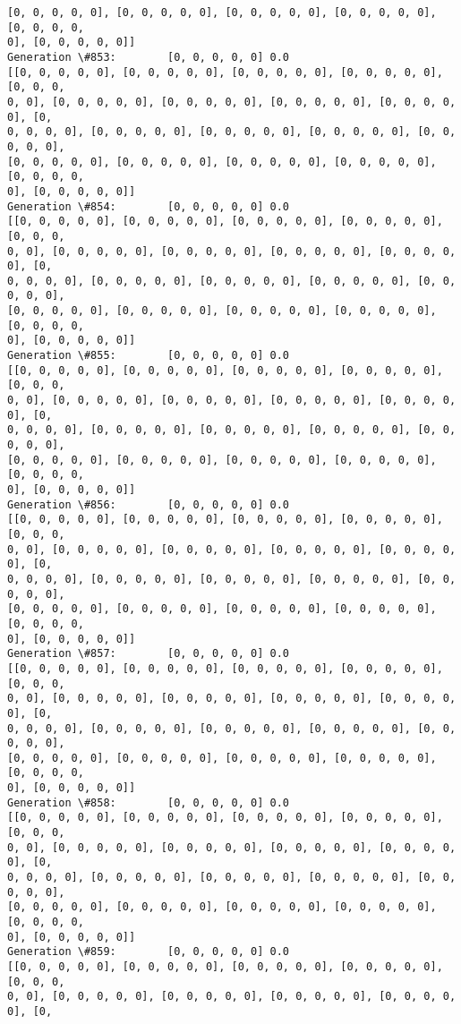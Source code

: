 \documentclass[11pt]{article}
\begin{document}
\begin{Verbatim}[commandchars=\\\{\}]
[0, 0, 0, 0, 0], [0, 0, 0, 0, 0], [0, 0, 0, 0, 0], [0, 0, 0, 0, 0], [0, 0, 0, 0,
0], [0, 0, 0, 0, 0]]
Generation \#853:        [0, 0, 0, 0, 0] 0.0
[[0, 0, 0, 0, 0], [0, 0, 0, 0, 0], [0, 0, 0, 0, 0], [0, 0, 0, 0, 0], [0, 0, 0,
0, 0], [0, 0, 0, 0, 0], [0, 0, 0, 0, 0], [0, 0, 0, 0, 0], [0, 0, 0, 0, 0], [0,
0, 0, 0, 0], [0, 0, 0, 0, 0], [0, 0, 0, 0, 0], [0, 0, 0, 0, 0], [0, 0, 0, 0, 0],
[0, 0, 0, 0, 0], [0, 0, 0, 0, 0], [0, 0, 0, 0, 0], [0, 0, 0, 0, 0], [0, 0, 0, 0,
0], [0, 0, 0, 0, 0]]
Generation \#854:        [0, 0, 0, 0, 0] 0.0
[[0, 0, 0, 0, 0], [0, 0, 0, 0, 0], [0, 0, 0, 0, 0], [0, 0, 0, 0, 0], [0, 0, 0,
0, 0], [0, 0, 0, 0, 0], [0, 0, 0, 0, 0], [0, 0, 0, 0, 0], [0, 0, 0, 0, 0], [0,
0, 0, 0, 0], [0, 0, 0, 0, 0], [0, 0, 0, 0, 0], [0, 0, 0, 0, 0], [0, 0, 0, 0, 0],
[0, 0, 0, 0, 0], [0, 0, 0, 0, 0], [0, 0, 0, 0, 0], [0, 0, 0, 0, 0], [0, 0, 0, 0,
0], [0, 0, 0, 0, 0]]
Generation \#855:        [0, 0, 0, 0, 0] 0.0
[[0, 0, 0, 0, 0], [0, 0, 0, 0, 0], [0, 0, 0, 0, 0], [0, 0, 0, 0, 0], [0, 0, 0,
0, 0], [0, 0, 0, 0, 0], [0, 0, 0, 0, 0], [0, 0, 0, 0, 0], [0, 0, 0, 0, 0], [0,
0, 0, 0, 0], [0, 0, 0, 0, 0], [0, 0, 0, 0, 0], [0, 0, 0, 0, 0], [0, 0, 0, 0, 0],
[0, 0, 0, 0, 0], [0, 0, 0, 0, 0], [0, 0, 0, 0, 0], [0, 0, 0, 0, 0], [0, 0, 0, 0,
0], [0, 0, 0, 0, 0]]
Generation \#856:        [0, 0, 0, 0, 0] 0.0
[[0, 0, 0, 0, 0], [0, 0, 0, 0, 0], [0, 0, 0, 0, 0], [0, 0, 0, 0, 0], [0, 0, 0,
0, 0], [0, 0, 0, 0, 0], [0, 0, 0, 0, 0], [0, 0, 0, 0, 0], [0, 0, 0, 0, 0], [0,
0, 0, 0, 0], [0, 0, 0, 0, 0], [0, 0, 0, 0, 0], [0, 0, 0, 0, 0], [0, 0, 0, 0, 0],
[0, 0, 0, 0, 0], [0, 0, 0, 0, 0], [0, 0, 0, 0, 0], [0, 0, 0, 0, 0], [0, 0, 0, 0,
0], [0, 0, 0, 0, 0]]
Generation \#857:        [0, 0, 0, 0, 0] 0.0
[[0, 0, 0, 0, 0], [0, 0, 0, 0, 0], [0, 0, 0, 0, 0], [0, 0, 0, 0, 0], [0, 0, 0,
0, 0], [0, 0, 0, 0, 0], [0, 0, 0, 0, 0], [0, 0, 0, 0, 0], [0, 0, 0, 0, 0], [0,
0, 0, 0, 0], [0, 0, 0, 0, 0], [0, 0, 0, 0, 0], [0, 0, 0, 0, 0], [0, 0, 0, 0, 0],
[0, 0, 0, 0, 0], [0, 0, 0, 0, 0], [0, 0, 0, 0, 0], [0, 0, 0, 0, 0], [0, 0, 0, 0,
0], [0, 0, 0, 0, 0]]
Generation \#858:        [0, 0, 0, 0, 0] 0.0
[[0, 0, 0, 0, 0], [0, 0, 0, 0, 0], [0, 0, 0, 0, 0], [0, 0, 0, 0, 0], [0, 0, 0,
0, 0], [0, 0, 0, 0, 0], [0, 0, 0, 0, 0], [0, 0, 0, 0, 0], [0, 0, 0, 0, 0], [0,
0, 0, 0, 0], [0, 0, 0, 0, 0], [0, 0, 0, 0, 0], [0, 0, 0, 0, 0], [0, 0, 0, 0, 0],
[0, 0, 0, 0, 0], [0, 0, 0, 0, 0], [0, 0, 0, 0, 0], [0, 0, 0, 0, 0], [0, 0, 0, 0,
0], [0, 0, 0, 0, 0]]
Generation \#859:        [0, 0, 0, 0, 0] 0.0
[[0, 0, 0, 0, 0], [0, 0, 0, 0, 0], [0, 0, 0, 0, 0], [0, 0, 0, 0, 0], [0, 0, 0,
0, 0], [0, 0, 0, 0, 0], [0, 0, 0, 0, 0], [0, 0, 0, 0, 0], [0, 0, 0, 0, 0], [0,

\end{Verbatim}
\end{document}
